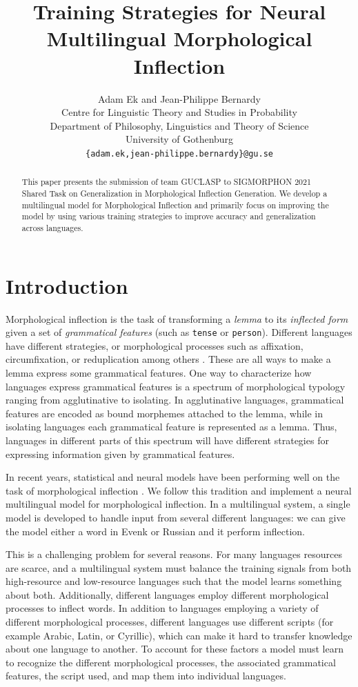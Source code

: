 \documentclass[11pt,a4paper]{article}
\title{Training Strategies for Neural Multilingual Morphological Inflection}
\author{Adam Ek and Jean-Philippe Bernardy \\
	Centre for Linguistic Theory and Studies in Probability \\
	Department of Philosophy, Linguistics and Theory of Science \\
	University of Gothenburg \\
	\texttt{\{adam.ek,jean-philippe.bernardy\}@gu.se} \\}
\date{}
\begin{document}
\maketitle
\begin{abstract}
This paper presents the submission of team GUCLASP to SIGMORPHON 2021
Shared Task on Generalization in Morphological Inflection Generation.
We develop a multilingual model for Morphological Inflection and
primarily focus on improving the model by using various training
strategies to improve accuracy and generalization across languages.
\end{abstract}

\section{Introduction}

Morphological inflection is the task of transforming a \emph{lemma} to
its \emph{inflected form} given a set of \emph{grammatical features}
(such as \texttt{tense} or \texttt{person}).  Different languages have
different strategies, or morphological processes such as affixation,
circumfixation, or reduplication among others
\cite{haspelmath2013understanding}.  These are all ways to make a
lemma express some grammatical features.  One way to characterize
how languages express grammatical features is a spectrum of
morphological typology ranging from agglutinative to isolating. In
agglutinative languages, grammatical features are encoded as bound
morphemes attached to the lemma, while in isolating languages each
grammatical feature is represented as a lemma. Thus, languages in
different parts of this spectrum will have different strategies for
expressing information given by grammatical features.

In recent years, statistical and neural models have been performing
well on the task of morphological inflection
\cite{DBLP:conf/eacl/SmitVGK14, kann2016med,
DBLP:conf/conll/MakarovRC17, sharma-etal-2018-iit}. We follow this
tradition and implement a neural multilingual model for morphological
inflection. In a multilingual system, a single model is developed to
handle input from several different languages:  we can give
the model either a word in Evenk or Russian and it perform inflection.

This is a challenging problem for several reasons. For many languages
resources are scarce, and a multilingual system must balance
the training signals from both high-resource and low-resource
languages such that the model learns something about both.
Additionally, different languages employ different morphological
processes to inflect words. In addition to languages employing a
variety of different morphological processes, different languages use
different scripts (for example Arabic, Latin, or Cyrillic), which can
make it hard to transfer knowledge about one language to another.  To
account for these factors a model must learn to recognize the
different morphological processes, the associated grammatical
features, the script used, and map them into individual languages.
\end{document}
